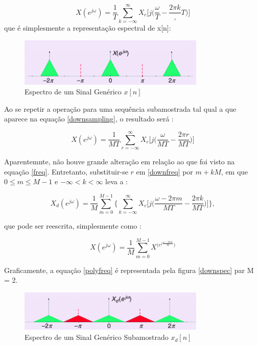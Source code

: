\begin{equation}\label{freq}
X(e^{j\omega}) = \frac{1}{T}\sum_{k = -\infty}^{\infty}X_{c}\bigg[j\bigg(\frac{\omega}{T}-\frac{2\pi k},{T}\bigg)\bigg]
\end{equation}
que é simplesmente a representação espectral de x[n]:

\begin{figure}[h!]
\centering
\includegraphics[width=3.5in]{espectro_gen.png}
\caption{Espectro de um Sinal Genérico $x[n]$ \cite{Krishna}}
\label{espec}
\end{figure}

Ao se repetir a operação para uma sequência subamostrada tal qual a que aparece na equação \ref{downsampling}, o resultado será \cite{Krishna}:

\begin{equation}\label{downfreq}
X(e^{j\omega}) = \frac{1}{MT}\sum_{r = -\infty}^{\infty}X_{c}\bigg[j\bigg(\frac{\omega}{MT}-\frac{2\pi r}{MT}\bigg)\bigg]
\end{equation}

\par Aparentemnte, não houve grande alteração em relação ao que foi visto na equação \ref{freq}. Entretanto, substituir-se $r$ em \ref{downfreq} por $m + kM$, em que $ 0 \leq m \leq M-1$ e $-\infty < k < \infty$ leva a \cite{Krishna}:

\begin{equation}\label{downfreq}
X_{d}(e^{j\omega}) = \frac{1}{M}\sum_{m=0}^{M-1}\bigg\{\sum_{k = -\infty}^{\infty}X_{c}\bigg[j\bigg(\frac{\omega-2 \pi m}{MT}-\frac{2\pi k}{MT}\bigg)\bigg]\bigg\},
\end{equation}

que pode ser reescrita, simplesmente como \cite{Krishna}:

\begin{equation}\label{polyfreq}
X(e^{j\omega}) = \frac{1}{M}\sum_{m = 0}^{M-1}X^{\big(e^{j\frac{\omega-2\pi m}{M}}\big)}
\end{equation}

\par Graficamente, a equação \ref{polyfreq} é representada pela figura \ref{downspec} par M = 2. 

\begin{figure}[h!]
\centering
\includegraphics[width=3.5in]{down_espectro_gen.png}
\caption{Espectro de um Sinal Genérico Subamostrado $x_{d}[n]$ \cite{Krishna}}
\label{downespec}
\end{figure}

